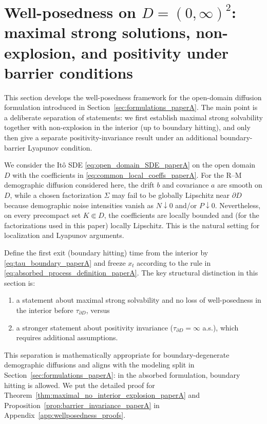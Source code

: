 \documentclass[pdflatex,sn-mathphys-ay]{sn-jnl}
\theoremstyle{thmstyleone}
\theoremstyle{definition}
\theoremstyle{remark}
\begin{document}
\section{Well-posedness on \(D=(0,\infty)^2\): maximal strong solutions, non-explosion, and positivity under barrier conditions}
\label{sec:wellposed_paperA}

This section develops the well-posedness framework for the open-domain diffusion formulation introduced in Section~\ref{sec:formulations_paperA}. The main point is a deliberate separation of statements: we first establish maximal strong solvability together with non-explosion in the interior (up to boundary hitting), and only then give a separate positivity-invariance result under an additional boundary-barrier Lyapunov condition.

We consider the It\^o SDE \eqref{eq:open_domain_SDE_paperA} on the open domain $D$ with the coefficients in \eqref{eq:common_local_coeffs_paperA}.
For the R--M demographic diffusion considered here, the drift \(b\) and covariance \(a\) are smooth on \(D\), while a chosen factorization \(\Sigma\) may fail to be globally Lipschitz near \(\partial D\) because demographic noise intensities vanish as \(N\downarrow 0\) and/or \(P\downarrow 0\). Nevertheless, on every precompact set \(K\Subset D\), the coefficients are locally bounded and (for the factorizations used in this paper) locally Lipschitz. This is the natural setting for localization and Lyapunov arguments.

Define the first exit (boundary hitting) time from the interior by \eqref{eq:tau_boundary_paperA} and freeze $x_t$ according to the rule in \eqref{eq:absorbed_process_definition_paperA}.
The key structural distinction in this section is:
\begin{enumerate}[label=(\roman*)]
\item a statement about maximal strong solvability and no loss of well-posedness in the interior before \(\tau_{\partial D}\), versus
\item a stronger statement about positivity invariance (\(\tau_{\partial D}=\infty\) a.s.), which requires additional assumptions.
\end{enumerate}
This separation is mathematically appropriate for boundary-degenerate demographic diffusions and aligns with the modeling split in Section~\ref{sec:formulations_paperA}: in the absorbed formulation, boundary hitting is allowed. We put the detailed proof for Theorem~\ref{thm:maximal_no_interior_explosion_paperA} and Proposition~\ref{prop:barrier_invariance_paperA} in Appendix~\ref{app:wellposedness_proofs}.
\end{document}
